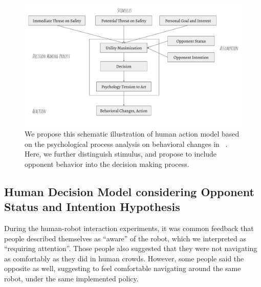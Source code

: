 \documentclass[conference]{IEEEtran}
\begin{document}
\begin{figure}[tb]
  \begin{center}
  \hspace*{-2em}
    \includegraphics[width=1.05\columnwidth]{images/behavior_change.pdf}
  \hspace*{-2em}
  \vspace*{-1.5em}
  \end{center}
  \vspace{-0.05in}
  \caption{We propose this schematic illustration of human action model based 
    on the psychological process analysis on behavioral changes in ~\cite{helbing1995social}.
    Here, we further distinguish stimulus, and propose to include opponent 
    behavior into the decision making process.}
\vspace{-0.05in}
\label{fig:behavior}
\end{figure}
\vspace{-.5em}
\subsection{Human Decision Model considering Opponent Status and Intention Hypothesis}
During the human-robot interaction experiments,
 it was common feedback that 
people described themselves as ``aware'' of the robot, which we interpreted as 
``requiring attention''. Those people also suggested that they were not navigating as 
comfortably as they did in human crowds. However, some people said the opposite as 
well, suggesting to feel comfortable navigating around the same robot, under 
the same implemented policy.
\end{document}
